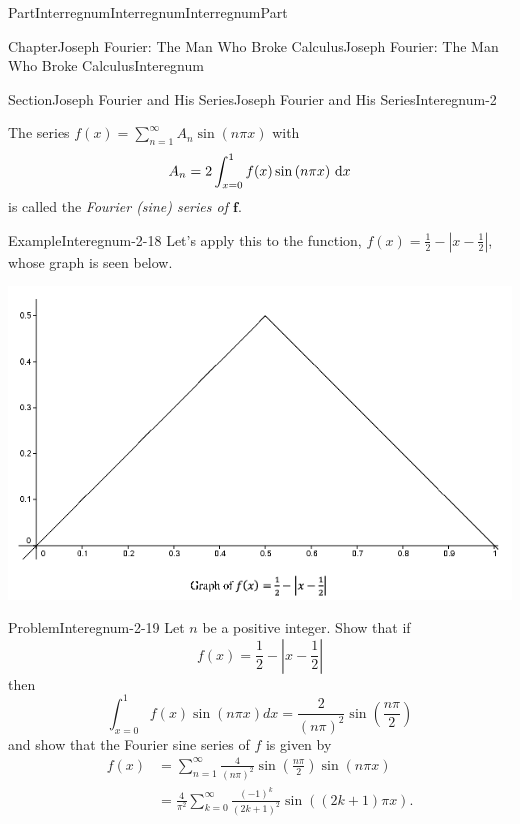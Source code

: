\documentclass[oneside,10pt,]{book}
\numberwithin{equation}{part}
\newcommand{\dx}[1]{\,{\rm d}#1}
\newcommand{\abs}[1]{\left|#1\right|}
\newcommand{\amp}{&}
\begin{document}
\begin{partptx}{Part}{Interregnum}{}{Interregnum}{}{}{InterregnumPart}
\begin{chapterptx}{Chapter}{Joseph Fourier: The Man Who Broke Calculus}{}{Joseph Fourier: The Man Who Broke Calculus}{}{}{Interegnum}
\begin{sectionptx}{Section}{Joseph Fourier and His Series}{}{Joseph Fourier and His Series}{}{}{Interegnum-2}
\par
The series \(f(x)=\sum_{n=1}^\infty A_n\sin\left(n\pi
x\right)\) with%
\begin{equation}
A_n=2\int_{x=0}^1f(x)\sin\left(n\pi
x\right)\dx{ x}\label{EQUATIONSineCoeffFourier}
\end{equation}
is called the \emph{Fourier (sine) series of \(\boldsymbol{f}\)}.%
\begin{example}{Example}{}{Interegnum-2-18}%
Let's apply this to the function, \(f(x)=\frac{1}{2}-\abs{x-\frac{1}{2}}\), whose graph is seen below.%
\begin{image}{0.125}{0.75}{0.125}{}%
\includegraphics[width=\linewidth]{external/images/FourierEx1.png}
\end{image}%
\end{example}
\begin{problem}{Problem}{}{Interegnum-2-19}%
Let \(n\) be a positive integer. Show that if%
\begin{equation*}
f(x)=\frac{1}{2}-\abs{x-\frac{1}{2}}
\end{equation*}
then%
\begin{equation*}
\int_{x=0}^1f(x)\sin\left(n\pi x\right)d x = \frac{2}{\left(n\pi\right)^2}\sin\left(\frac{n\pi}{2}\right)
\end{equation*}
and show that the Fourier sine series of \(f\) is given by%
\begin{align*}
f(x)\amp{}=\sum_{n=1}^\infty\frac{4}{\left(n\pi\right)^2}\sin\left(\frac{n\pi}{2}
\right)\sin\left(n\pi x\right)\\
\amp{}=\frac{4}{\pi^2}\sum_{k=0}^\infty\frac{\left(-1\right)^k}{\left(2k+1\right)^2}\sin\left(\left(2k+1\right)\pi x\right).{}
\end{align*}
%
\end{problem}

\end{sectionptx}
\end{chapterptx}
\end{partptx}
\end{document}
